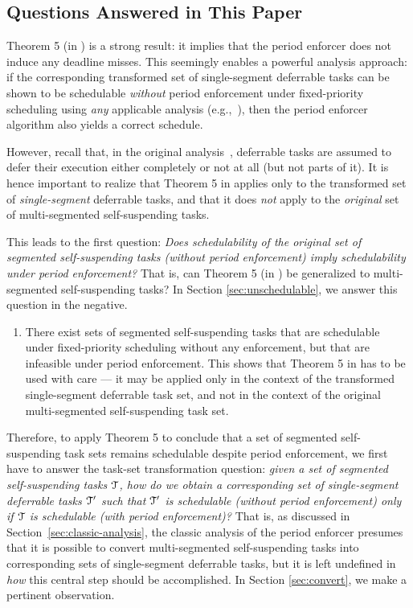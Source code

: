 \subsection{Questions Answered in This Paper}
\label{sec:questions}

Theorem 5 (in \cite{Raj:suspension1991}) is a strong result: it implies that the period enforcer does not induce any deadline misses. This seemingly enables a powerful analysis approach: if the corresponding transformed set of single-segment deferrable tasks can be shown to be schedulable  \emph{without} period enforcement under fixed-priority scheduling using \emph{any} applicable analysis (e.g.,~\cite{ABRTW:93}), then the period enforcer algorithm also yields a correct schedule. 

However, recall that, in the original analysis~\cite{Raj:suspension1991}, deferrable tasks are assumed to defer their  execution either completely or not at all (but not parts of it). It is hence important to realize that Theorem 5 in \cite{Raj:suspension1991} applies only to the transformed set of \emph{single-segment} deferrable tasks, and that it does \emph{not} apply to the \emph{original} set of multi-segmented self-suspending tasks. 

This leads to the first question: \emph{Does schedulability of the  original set of segmented self-suspending tasks (without period enforcement) imply schedulability under period enforcement?} That is, can Theorem 5 (in \cite{Raj:suspension1991}) be generalized to multi-segmented self-suspending tasks? In Section \ref{sec:unschedulable}, we answer this question in the negative.

\begin{enumerate}
	\item There exist sets of segmented self-suspending tasks that are schedulable under fixed-priority scheduling without any enforcement, but that are infeasible under period enforcement. This shows that Theorem 5 in \cite{Raj:suspension1991} has to be  used with care --- it may be applied only in the context of the transformed single-segment deferrable task set, and not in the context of the original multi-segmented self-suspending task set.
\end{enumerate}


Therefore, to apply Theorem 5 to conclude that a set of segmented self-suspending task sets remains schedulable despite period enforcement, we first have to answer the task-set transformation question: \emph{given a set of segmented self-suspending tasks $\mathcal{T}$, how do we obtain a corresponding set of single-segment deferrable tasks $\mathcal{T}'$ such that $\mathcal{T}'$ is schedulable (without period enforcement)  only if $\mathcal{T}$ is schedulable (with period enforcement)?} That is, as discussed in Section~\ref{sec:classic-analysis}, the classic analysis of the period enforcer \cite{Raj:suspension1991} presumes that it is possible to convert multi-segmented self-suspending tasks into corresponding sets of single-segment deferrable tasks, but it is left undefined in~\cite{Raj:suspension1991}  \emph{how} this central step should be accomplished. In Section \ref{sec:convert}, we make a pertinent observation.

